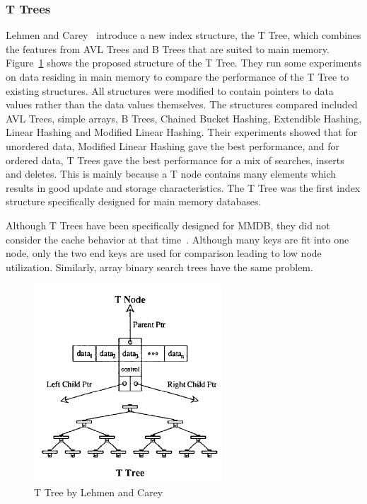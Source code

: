 \documentclass[12pt,a4paper]{article}
\begin{document}
\subsubsection*{T Trees}
Lehmen and Carey~\cite{lehman1986study} introduce a new index structure, the T Tree, which combines the features from AVL Trees and B Trees that are suited to
main memory. Figure~\ref{fig:ttree} shows the proposed structure of the T Tree. They run some experiments on data residing in main memory to compare the
performance of the T
Tree to existing structures. All structures were modified to contain pointers to data values rather than the data values themselves. The structures
compared included  AVL Trees, simple arrays, B Trees, Chained Bucket Hashing, Extendible Hashing, Linear Hashing and Modified Linear Hashing. Their
experiments showed that for unordered data, Modified Linear Hashing gave the best performance, and for ordered data, T Trees gave the best performance for a mix
of searches, inserts and deletes. This is mainly because a T node contains many elements which results in good update and storage characteristics. The T Tree
was the first index structure specifically designed for main memory databases.

Although T Trees have been specifically designed for MMDB, they did not consider the cache behavior at that time~\cite{rao1999cache}. Although many keys are
fit into one node, only the two end keys are used for comparison leading to low node utilization. Similarly, array binary search trees have the same problem. 

\begin{figure}[!t]
\centering
\includegraphics[width=7cm]{figs/Ttree.png}
\caption{T Tree by Lehmen and Carey~\cite{lehman1986study}}
\label{fig:ttree}
\end{figure}
\end{document}

